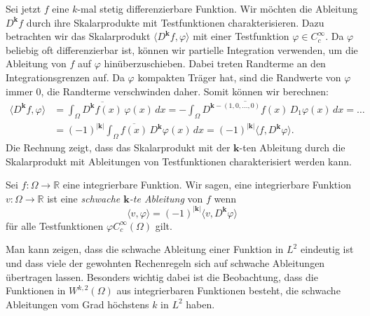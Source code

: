 Sei jetzt $f$ eine $k$-mal stetig differenzierbare Funktion.
Wir möchten die Ableitung $D^{\bm{k}}f$ durch ihre Skalarprodukte mit
Testfunktionen charakterisieren.
Dazu betrachten wir das Skalarprodukt
\(
\langle D^{\bm{k}}f,\varphi\rangle
\)
mit einer Testfunktion $\varphi\in C_c^{\infty}$.
Da $\varphi$ beliebig oft differenzierbar ist, können wir
partielle Integration verwenden, um die Ableitung von $f$ auf $\varphi$
hinüberzuschieben.
Dabei treten Randterme an den Integrationsgrenzen auf.
Da $\varphi$ kompakten Träger hat, sind die Randwerte von $\varphi$
immer 0, die Randterme verschwinden daher.
Somit können wir berechnen:
\begin{align*}
\langle D^{\bm{k}}f,\varphi\rangle
&=
\int_{\Omega} \overline{D^{\bm{k}}f(x)}\, \varphi(x)\,dx
=
-\int_{\Omega}
\overline{D^{\bm{k}-(1,0,\dots,0)}f(x)}\, 
D_1 \varphi(x)
\,dx
= \dots
\\
&=
(-1)^{|\bm{k}|} \int_{\Omega} \overline{f(x)} \, D^{\bm{k}}\varphi(x) \,dx
=
(-1)^{|\bm{k}|} \langle f,D^{\bm{k}}\varphi\rangle.
\end{align*}
Die Rechnung zeigt, dass das Skalarprodukt mit der $\bm{k}$-ten
Ableitung durch die Skalarprodukt mit Ableitungen von Testfunktionen
charakterisiert werden kann.

\begin{definition}
Sei $f\colon\Omega\to\mathbb{R}$  eine integrierbare Funktion.
Wir sagen, eine integrierbare Funktion $v\colon\Omega\to\mathbb{R}$ 
ist eine {\em schwache $\bm{k}$-te Ableitung} von $f$ wenn 
\[
\langle v,\varphi\rangle
=
(-1)^{|\bm{k}|} \langle v,D^{\bm{k}}\varphi\rangle
\]
für alle Testfunktionen $\varphi C_c^{\infty}(\Omega)$ gilt.
\end{definition}

Man kann zeigen, dass die schwache Ableitung einer Funktion
in $L^2$ eindeutig ist und dass viele der gewohnten Rechenregeln
sich auf schwache Ableitungen übertragen lassen.
Besonders wichtig dabei ist die Beobachtung, dass die Funktionen
in $W^{k,2}(\Omega)$ aus integrierbaren Funktionen besteht, die 
schwache Ableitungen vom Grad höchstens $k$ in $L^2$ haben.

